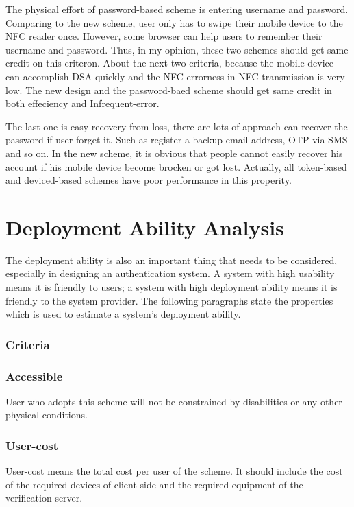 \begin{CJK}{Bg5}{bsmi}
The physical effort of password-based scheme is entering username and password. Comparing to the new scheme, user only has to swipe their mobile device to the NFC reader once. However, some browser can help users to remember their username and password. Thus, in my opinion, these two schemes should get same credit on this criteron. About the next two criteria, because the mobile device can accomplish DSA quickly and the NFC errorness in NFC transmission is very low. The new design and the password-baed scheme should get same credit in both effeciency and Infrequent-error.

The last one is easy-recovery-from-loss, there are lots of approach can recover the password if user forget it. Such as register a backup email address, OTP via SMS and so on. In the new scheme, it is obvious that people cannot easily recover his account if his mobile device become brocken or got lost. Actually, all token-based and deviced-based schemes have poor performance in this properity.

\section{Deployment Ability Analysis}

The deployment ability is also an important thing that needs to be considered, especially in designing an authentication system. A system with high usability means it is friendly to users; a system with high deployment ability means it is friendly to the system provider. The following paragraphs state the properties which is used to estimate a system's deployment ability.

\subsubsection{Criteria}

\subsubsection{Accessible}

User who adopts this scheme will not be constrained by disabilities or any other physical conditions.

\subsubsection{User-cost}

User-cost means the total cost per user of the scheme. It should include the cost of the required devices of client-side and the required equipment of the verification server.


\end{CJK}
